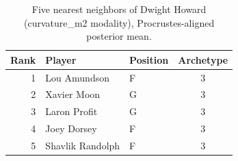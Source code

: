 \begin{table}[htbp]
  \centering\small
  \begin{tabular}{rllc}
    \toprule
    Rank & Player & Position & Archetype \\
    \midrule
    1 & Lou Amundson & F & 3 \\
    2 & Xavier Moon & G & 3 \\
    3 & Laron Profit & G & 3 \\
    4 & Joey Dorsey & F & 3 \\
    5 & Shavlik Randolph & F & 3 \\
    \bottomrule
  \end{tabular}
  \caption{Five nearest neighbors of Dwight Howard (curvature_m2 modality), Procrustes-aligned posterior mean.}
  \label{tab:Dwight_Howard_neighbors_curvature_m2}
\end{table}

